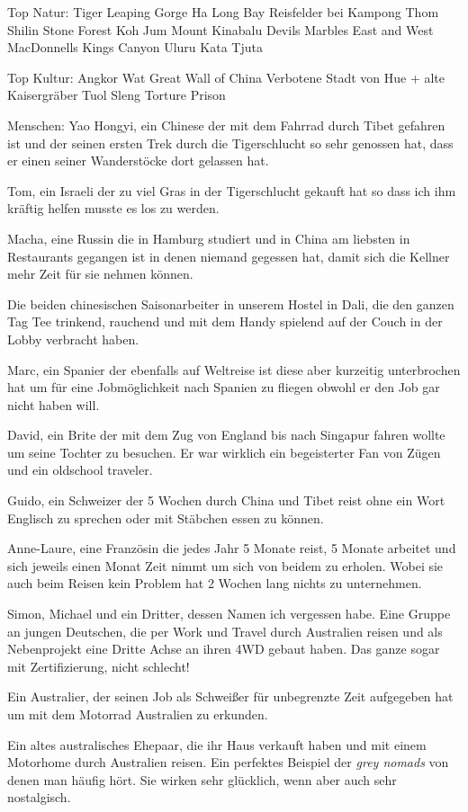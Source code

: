\documentclass[11pt]{book}
\begin{document}
Top Natur:
Tiger Leaping Gorge
Ha Long Bay
Reisfelder bei Kampong Thom
Shilin Stone Forest
Koh Jum
Mount Kinabalu
Devils Marbles
East and West MacDonnells
Kings Canyon
Uluru
Kata Tjuta


Top Kultur:
Angkor Wat
Great Wall of China
Verbotene Stadt von Hue + alte Kaisergräber 
Tuol Sleng Torture Prison

Menschen:
Yao Hongyi, ein Chinese der mit dem Fahrrad durch Tibet gefahren ist und der seinen ersten Trek durch die Tigerschlucht so sehr 
genossen hat, dass er einen seiner Wanderstöcke dort gelassen hat.

Tom, ein Israeli der zu viel Gras in der Tigerschlucht gekauft hat so dass ich ihm kräftig helfen musste es los zu werden.

Macha, eine Russin die in Hamburg studiert und in China am liebsten in Restaurants gegangen ist in denen niemand gegessen hat, damit sich 
die Kellner mehr Zeit für sie nehmen können.

Die beiden chinesischen Saisonarbeiter in unserem Hostel in Dali, die den ganzen Tag Tee trinkend, rauchend und mit dem Handy spielend 
auf der Couch in der Lobby verbracht haben.

Marc, ein Spanier der ebenfalls auf Weltreise ist diese aber kurzeitig unterbrochen hat um für eine Jobmöglichkeit nach Spanien zu fliegen 
obwohl er den Job gar nicht haben will.

David, ein Brite der mit dem Zug von England bis nach Singapur fahren wollte um seine Tochter zu besuchen. Er war wirklich ein begeisterter
Fan von Zügen und ein oldschool traveler.

Guido, ein Schweizer der 5 Wochen durch China und Tibet reist ohne ein Wort Englisch zu sprechen oder mit Stäbchen essen zu können.

Anne-Laure, eine Französin die jedes Jahr 5 Monate reist, 5 Monate arbeitet und sich jeweils einen Monat Zeit nimmt um sich von beidem 
zu erholen. Wobei sie auch beim Reisen kein Problem hat 2 Wochen lang nichts zu unternehmen.

Simon, Michael und ein Dritter, dessen Namen ich vergessen habe. Eine Gruppe an jungen Deutschen, die per Work und Travel durch 
Australien reisen und als Nebenprojekt eine Dritte Achse an ihren 4WD gebaut haben. Das ganze sogar mit Zertifizierung, nicht schlecht!

Ein Australier, der seinen Job als Schweißer für unbegrenzte Zeit aufgegeben hat um mit dem Motorrad Australien zu erkunden.

Ein altes australisches Ehepaar, die ihr Haus verkauft haben und mit einem Motorhome durch Australien reisen. Ein perfektes 
Beispiel der \emph{grey nomads} von denen man häufig hört. Sie wirken sehr glücklich, wenn aber auch sehr nostalgisch.
\end{document}
